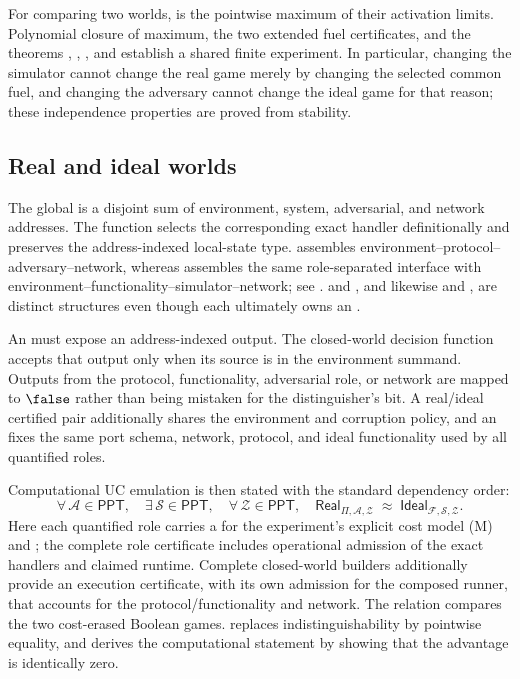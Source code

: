 For comparing two worlds,  is the
pointwise maximum of their activation limits.  Polynomial closure of maximum,
the two extended fuel certificates, and the theorems ,
, , and  establish a
shared finite experiment.  In particular, changing the simulator cannot
change the real game merely by changing the selected common fuel, and changing
the adversary cannot change the ideal game for that reason; these independence
properties are proved from stability.

\subsection{Real and ideal worlds}

The global  is a disjoint sum of environment, system,
adversarial, and network addresses.  The function 
selects the corresponding exact handler definitionally and preserves the
address-indexed local-state type.   assembles
environment--protocol--adversary--network, whereas 
assembles the same role-separated interface with
environment--functionality--simulator--network; see
.   and
, and likewise  and
, are distinct structures even though each ultimately owns an
.

An  must expose an address-indexed
  output.
The closed-world decision function accepts that output only when its source is
in the environment summand.  Outputs from the protocol, functionality,
adversarial role, or network are mapped to $\false$ rather than being mistaken
for the distinguisher's bit.  A real/ideal certified pair additionally shares
the environment and corruption policy, and an  fixes the
same port schema, network, protocol, and ideal functionality used by all
quantified roles.

Computational UC emulation is then stated with the standard dependency order:
\begin{equation}
  \forall\,\mathcal{A}\in\mathsf{PPT},\quad
  \exists\,\mathcal{S}\in\mathsf{PPT},\quad
  \forall\,\mathcal{Z}\in\mathsf{PPT},\quad
  \mathsf{Real}_{\Pi,\mathcal{A},\mathcal{Z}}
    \;\approx\;
  \mathsf{Ideal}_{\mathcal{F},\mathcal{S},\mathcal{Z}}.
  \label{eq:uc-emulation}
\end{equation}
Here each quantified role carries a  for the
experiment's explicit cost model (M) and ; the complete
role certificate includes operational admission of the exact handlers and
claimed runtime.  Complete closed-world builders additionally provide an
execution certificate, with its own admission for the composed runner, that
accounts for the protocol/functionality and network.  The relation
 compares the two cost-erased Boolean games.
 replaces indistinguishability by pointwise equality,
and  derives the computational statement by
showing that the advantage is identically zero.

